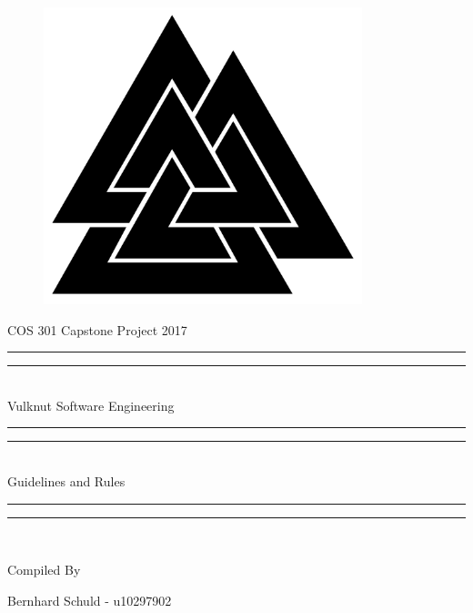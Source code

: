 \documentclass{article}
\begin{document}
	{\begingroup
		\begin{figure}[t]
			\centering
			\includegraphics[width=350px]{vseLogo.png}
		\end{figure}
		\centering

		{\Large COS 301 Capstone Project 2017}

		\vspace*{\baselineskip}

		\rule{\textwidth}{1.6pt}\vspace*{-\baselineskip}\vspace*{2pt}
		\rule{\textwidth}{0.4pt}\\[\baselineskip]

		{\Huge Vulknut Software Engineering } \\ [0.2\baselineskip]

		\rule{\textwidth}{0.4pt}\vspace*{-\baselineskip}\vspace*{2pt}
		\rule{\textwidth}{0.4pt}\\[\baselineskip]

		{\Large Guidelines and Rules } \\ [0.2\baselineskip]

		\rule{\textwidth}{0.4pt}\vspace*{-\baselineskip}\vspace{3.2pt}
		\rule{\textwidth}{1.6pt}\\[\baselineskip] %



		\bigskip

		Compiled By \\[\baselineskip]

		\bigskip

		{\Large Bernhard Schuld - u10297902 \\\par}

		\bigskip
		\bigskip

\endgroup}
\end{document}
